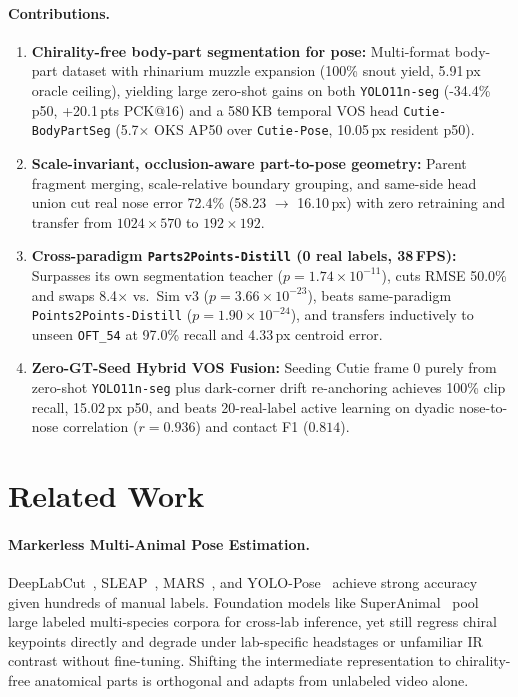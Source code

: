 \documentclass[10pt,twocolumn,letterpaper]{article}
\begin{document}
\paragraph{Contributions.}
\begin{enumerate}[leftmargin=*,itemsep=0.5pt,topsep=1.5pt]
  \item \textbf{Chirality-free body-part segmentation for pose:} Multi-format body-part dataset with rhinarium muzzle expansion (100\% snout yield, 5.91\,px oracle ceiling), yielding large zero-shot gains on both \texttt{YOLO11n-seg} (-34.4\% p50, +20.1\,pts PCK@16) and a 580\,KB temporal VOS head \texttt{Cutie-BodyPartSeg} (5.7$\times$ OKS AP50 over \texttt{Cutie-Pose}, 10.05\,px resident p50).
  \item \textbf{Scale-invariant, occlusion-aware part-to-pose geometry:} Parent fragment merging, scale-relative boundary grouping, and same-side head union cut real nose error 72.4\% (58.23 $\to$ 16.10\,px) with zero retraining and transfer from $1024\times 570$ to $192\times 192$.
  \item \textbf{Cross-paradigm \texttt{Parts2Points-Distill} (0 real labels, 38\,FPS):} Surpasses its own segmentation teacher ($p=1.74\times 10^{-11}$), cuts RMSE 50.0\% and swaps 8.4$\times$ vs.\ Sim v3 ($p=3.66\times 10^{-23}$), beats same-paradigm \texttt{Points2Points-Distill} ($p=1.90\times 10^{-24}$), and transfers inductively to unseen \texttt{OFT\_54} at 97.0\% recall and 4.33\,px centroid error.
  \item \textbf{Zero-GT-Seed Hybrid VOS Fusion:} Seeding Cutie frame 0 purely from zero-shot \texttt{YOLO11n-seg} plus dark-corner drift re-anchoring achieves 100\% clip recall, 15.02\,px p50, and beats 20-real-label active learning on dyadic nose-to-nose correlation ($r=0.936$) and contact F1 ($0.814$).
\end{enumerate}

\section{Related Work}

\paragraph{Markerless Multi-Animal Pose Estimation.} DeepLabCut~\cite{mathis2018deeplabcut,lauer2022multi}, SLEAP~\cite{pereira2022sleap}, MARS~\cite{segalin2021mars}, and YOLO-Pose~\cite{jocher2023ultralytics} achieve strong accuracy given hundreds of manual labels. Foundation models like SuperAnimal~\cite{ye2024superanimal} pool large labeled multi-species corpora for cross-lab inference, yet still regress chiral keypoints directly and degrade under lab-specific headstages or unfamiliar IR contrast without fine-tuning. Shifting the intermediate representation to chirality-free anatomical parts is orthogonal and adapts from unlabeled video alone.
\end{document}
